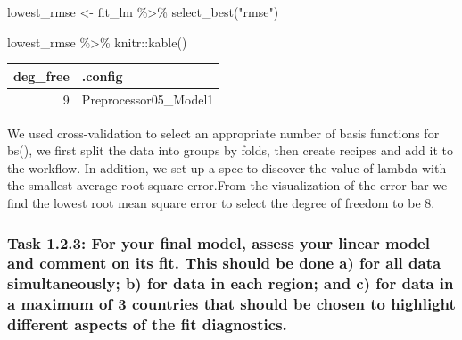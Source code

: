\documentclass[
]{article}
\newenvironment{Shaded}{\begin{snugshade}}{\end{snugshade}}
\newcommand{\FunctionTok}[1]{\textcolor[rgb]{0.00,0.00,0.00}{#1}}
\newcommand{\NormalTok}[1]{#1}
\newcommand{\OtherTok}[1]{\textcolor[rgb]{0.56,0.35,0.01}{#1}}
\newcommand{\SpecialCharTok}[1]{\textcolor[rgb]{0.00,0.00,0.00}{#1}}
\newcommand{\StringTok}[1]{\textcolor[rgb]{0.31,0.60,0.02}{#1}}
\begin{document}
\begin{Shaded}
\begin{Highlighting}[]
\NormalTok{lowest\_rmse }\OtherTok{\textless{}{-}}\NormalTok{ fit\_lm }\SpecialCharTok{\%\textgreater{}\%} 
  \FunctionTok{select\_best}\NormalTok{(}\StringTok{"rmse"}\NormalTok{)}

\NormalTok{lowest\_rmse }\SpecialCharTok{\%\textgreater{}\%}\NormalTok{ knitr}\SpecialCharTok{::}\FunctionTok{kable}\NormalTok{()}
\end{Highlighting}
\end{Shaded}

\begin{tabular}{r|l}
\hline
deg\_free & .config\\
\hline
9 & Preprocessor05\_Model1\\
\hline
\end{tabular}

We used cross-validation to select an appropriate number of basis
functions for bs(), we first split the data into groups by folds, then
create recipes and add it to the workflow. In addition, we set up a spec
to discover the value of lambda with the smallest average root square
error.From the visualization of the error bar we find the lowest root
mean square error to select the degree of freedom to be 8.

\hypertarget{task-1.2.3-for-your-final-model-assess-your-linear-model-and-comment-on-its-fit.-this-should-be-done-a-for-all-data-simultaneously-b-for-data-in-each-region-and-c-for-data-in-a-maximum-of-3-countries-that-should-be-chosen-to-highlight-different-aspects-of-the-fit-diagnostics.}{%
\subsubsection{Task 1.2.3: For your final model, assess your linear
model and comment on its fit. This should be done a) for all data
simultaneously; b) for data in each region; and c) for data in a maximum
of 3 countries that should be chosen to highlight different aspects of
the fit
diagnostics.}\label{task-1.2.3-for-your-final-model-assess-your-linear-model-and-comment-on-its-fit.-this-should-be-done-a-for-all-data-simultaneously-b-for-data-in-each-region-and-c-for-data-in-a-maximum-of-3-countries-that-should-be-chosen-to-highlight-different-aspects-of-the-fit-diagnostics.}}
\end{document}

